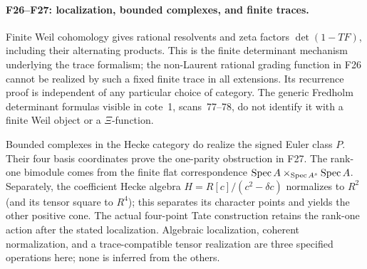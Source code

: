 \documentclass[11pt,a4paper]{article}
\newcommand{\fid}[1]{\textsf{#1}}\newcommand{\gate}[1]{\textsf{#1}}
\theoremstyle{named}\newtheorem{finding}{Finding}[section]
\theoremstyle{definition}\newtheorem{definition}[finding]{Definition}
\theoremstyle{remark}\newtheorem{remark}[finding]{Remark}
\begin{document}
\paragraph{\fid{F26}--\fid{F27}: localization, bounded complexes, and finite traces.}
Finite Weil cohomology gives rational resolvents and zeta factors
$\det(1-TF)$, including their alternating products. This is the
finite determinant mechanism underlying the trace formalism; the
non-Laurent rational grading function in \fid{F26} cannot be realized
by such a fixed finite trace in all extensions. Its recurrence proof
is independent of any particular choice of category. The generic
Fredholm determinant formulas visible in cote~1, scans~77--78,
do not identify it with a finite Weil object or a $\Xi$-function.

Bounded complexes in the Hecke category do realize the signed Euler
class $P$. Their four basis coordinates prove the one-parity
obstruction in \fid{F27}. The rank-one bimodule comes from the
finite flat correspondence
$\operatorname{Spec} A\times_{\operatorname{Spec} A^s}\operatorname{Spec} A$. Separately, the coefficient
Hecke algebra $H=R[c]/(c^2-\delta c)$ normalizes to $R^2$
(and its tensor square to $R^4$); this separates its character
points and yields the other positive cone.
The actual four-point Tate construction retains the rank-one action
after the stated localization. Algebraic localization, coherent
normalization, and a trace-compatible tensor realization are three
specified operations here; none is inferred from the others.
\end{document}
